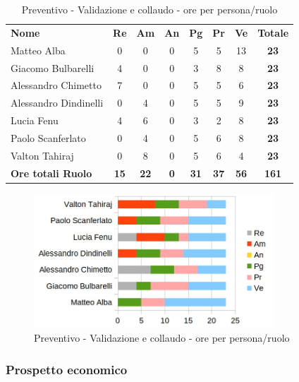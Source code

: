 		\begin{table} [h!]
			\begin{center}
				\begin{tabular} { m{3.5cm} c c c c c c c }
					\rowcolor{lightgray}
					\textbf{Nome} & \textbf{Re} & \textbf{Am} & \textbf{An} & \textbf{Pg} & \textbf{Pr} & \textbf{Ve} & \textbf{Totale} \\
					Matteo Alba & 0& 0&0 & 5 & 5 & 13 & \textbf{23} \\
					Giacomo Bulbarelli & 4 & 0&0 & 3 & 8 & 8 & \textbf{23} \\
					Alessandro Chimetto & 7 & 0& 0& 5 & 5 & 6 & \textbf{23} \\
					Alessandro Dindinelli &0 & 4 &0 & 5 & 5 & 9 & \textbf{23} \\
					Lucia Fenu & 4 & 6 & 0& 3 & 2 & 8 & \textbf{23} \\
					Paolo Scanferlato &0 & 4 & 0& 5 & 6 & 8 & \textbf{23} \\
					Valton Tahiraj &0 & 8 &0 & 5 & 6 & 4 & \textbf{23} \\
					\textbf{Ore totali Ruolo} & \textbf{15} & \textbf{22} & \textbf{0} & \textbf{31} & \textbf{37}& \textbf{56} & \textbf{161}
				\end{tabular}
				\caption{Preventivo - Validazione e collaudo - ore per persona/ruolo}
			\end{center}
		\end{table}
	
		\begin{figure} [h!]
			\centering
			\includegraphics[width=0.8\textwidth]{res/img/grafici/validazione_e_collaudo_ore_ruolo.jpg}
			\caption{Preventivo - Validazione e collaudo - ore per persona/ruolo} 
		\end{figure}
	
	\newpage
	
	\subsubsection{Prospetto economico}
	
